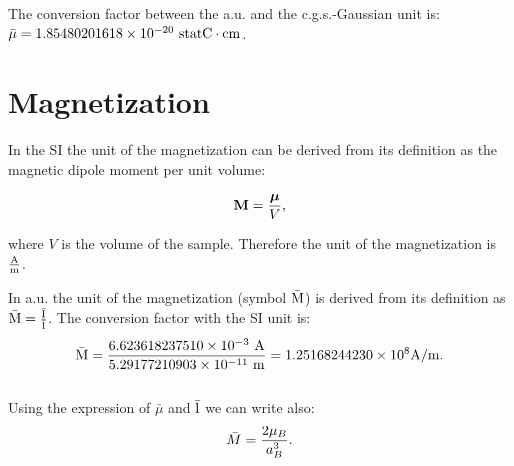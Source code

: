 \documentclass[12pt,a4paper,twoside]{report}
\def\barl{5.29177210903\times 10^{-11}}
\def\bari{6.623618237510\times 10^{-3}}
\def\barmag{1.25168244230\times 10^{8}}
\def\mutomu{9.99999999726\times 10^{-4}}
\def\barmucgs{1.85480201618\times 10^{-20}}
\begin{document}
{%

{\color{green} 
The conversion factor between the a.u. and the c.g.s.-Gaussian unit is: 
$\bar \mu = \barmucgs\ {\rm statC}\cdot {\rm cm}$.
}

\newpage
{\color{coral}\section{Magnetization}}
\color{black}

In the SI the unit of the magnetization can be derived from its definition
as the magnetic dipole moment per unit volume:

\begin{tcolorbox}
\begin{equation}
{\bf M} = {{\boldsymbol \mu}\over V},
\end{equation}
\end{tcolorbox}

where $V$ is the volume of the sample.
Therefore the unit of the magnetization is ${\rm A}\over {\rm m}$.  

{\color{web-blue} In a.u. the unit of the magnetization 
(symbol ${\rm \bar M}$) is derived from its definition
as ${\rm \bar M}= {{\rm \bar I} \over {\rm \bar l}}$. The conversion factor with
the SI unit is:
\begin{equation}
{\rm \bar M} = {\bari\ {\rm A} \over \barl\ {\rm m}} = \barmag {\rm A/m}.
\end{equation}
\\
Using the expression of $\bar \mu$ and ${\rm \bar l}$ we can write also:
\begin{equation}
\bar M = {2 \mu_B \over a_B^3}.
\end{equation}
}

}
\end{document}
